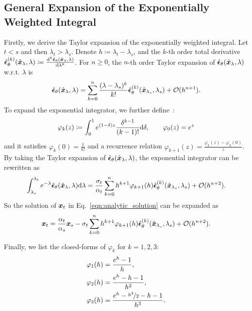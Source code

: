 \subsection{General Expansion of the Exponentially Weighted Integral}
\label{appendix:general_expansion}
Firstly, we derive the Taylor expansion of the exponentially weighted integral. Let $t<s$ and then $\lambda_t>\lambda_s$. Denote $h\coloneqq \lambda_t-\lambda_s$, and the $k$-th order total derivative $\hat{\bm{\epsilon}}_\theta^{(k)}(\hat{\bm{x}}_\lambda,\lambda)\coloneqq \frac{\dd^k \hat{\bm{\epsilon}}_\theta(\hat{\bm{x}}_\lambda,\lambda)}{\dd\lambda^k}$. For $n\geq 0$, the $n$-th order Taylor expansion of $\hat{\bm{\epsilon}}_\theta(\hat{\bm{x}}_{\lambda},\lambda)$ w.r.t. $\lambda$ is
\begin{equation}
    \label{eqn:taylor-epsilonv}
    \hat{\bm{\epsilon}}_\theta(\hat{\bm{x}}_\lambda, \lambda) = \sum_{k=0}^n \frac{(\lambda-\lambda_s)^k}{k!} \hat{\bm{\epsilon}}_\theta^{(k)}(\hat{\bm{x}}_{\lambda_s},\lambda_s)+\mathcal O(h^{n+1}).
\end{equation}
To expand the exponential integrator, we further define~\citep{hochbruck2005explicit}:
\begin{equation}
    \varphi_k(z)\coloneqq\int_0^1 e^{(1-\delta)z}\frac{\delta^{k-1}}{(k-1)!}\mathrm{d}\delta,\quad\quad \varphi_0(z)=e^z
\end{equation}
and it satisfies $\varphi_k(0)=\frac{1}{k!}$ and a recurrence relation $\varphi_{k+1}(z)=\frac{\varphi_k(z)-\varphi_k(0)}{z}$. By taking the Taylor expansion of $\hat{\bm{\epsilon}}_\theta(\hat{\bm{x}}_\lambda,\lambda)$, the exponential integrator can be rewritten as
\begin{equation}
    \int_{\lambda_s}^{\lambda_t} e^{-\lambda}\hat{\bm{\epsilon}}_\theta(\hat{\bm{x}}_{\lambda},\lambda)\dd\lambda = \frac{\sigma_t}{\alpha_t}\sum_{k=0}^n h^{k+1}\varphi_{k+1}(h)\hat{\bm{\epsilon}}_\theta^{(k)}(\hat{\bm{x}}_{\lambda_s},\lambda_s)+\mathcal O(h^{n+2}).
\end{equation}
So the solution of $\bm{x}_t$ in Eq.~\eqref{eqn:analytic_solution} can be expanded as
\begin{equation}
\label{eqn:analytic_expansion}
    \bm{x}_t = \frac{\alpha_t}{\alpha_s}\bm{x}_s - \sigma_t\sum_{k=0}^n h^{k+1}\varphi_{k+1}(h)\hat{\bm{\epsilon}}_\theta^{(k)}(\hat{\bm{x}}_{\lambda_s},\lambda_s)+\mathcal O(h^{n+2}).
\end{equation}

Finally, we list the closed-forms of $\varphi_k$ for $k = 1, 2, 3$:
\begin{align}
\varphi_1(h) &= \frac{e^h - 1}{h}, \\
\varphi_2(h) &= \frac{e^h - h - 1}{h^2}, \\
\varphi_3(h) &= \frac{e^h - \nicefrac{h^2}{2} - h - 1}{h^3}.
\end{align}





